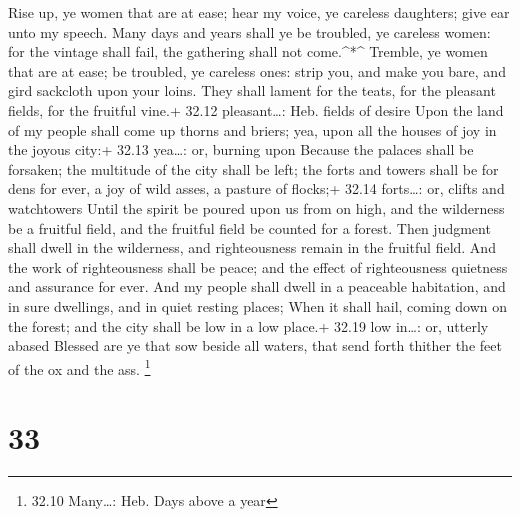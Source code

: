  Rise up, ye women that are at ease; hear my voice, ye
careless daughters; give ear unto my speech.  Many days and
years shall ye be troubled, ye careless women: for the vintage shall
fail, the gathering shall not come.\^{}*\^{}  Tremble, ye
women that are at ease; be troubled, ye careless ones: strip you, and
make you bare, and gird sackcloth upon your loins.  They
shall lament for the teats, for the pleasant fields, for the fruitful
vine.+ 32.12 pleasant\ldots: Heb. fields of desire  Upon
the land of my people shall come up thorns and briers; yea, upon all the
houses of joy in the joyous city:+ 32.13 yea\ldots: or, burning upon
 Because the palaces shall be forsaken; the multitude of
the city shall be left; the forts and towers shall be for dens for ever,
a joy of wild asses, a pasture of flocks;+ 32.14 forts\ldots: or, clifts
and watchtowers  Until the spirit be poured upon us from on
high, and the wilderness be a fruitful field, and the fruitful field be
counted for a forest.  Then judgment shall dwell in the
wilderness, and righteousness remain in the fruitful field.
 And the work of righteousness shall be peace; and the
effect of righteousness quietness and assurance for ever. 
And my people shall dwell in a peaceable habitation, and in sure
dwellings, and in quiet resting places;  When it shall
hail, coming down on the forest; and the city shall be low in a low
place.+ 32.19 low in\ldots: or, utterly abased  Blessed are
ye that sow beside all waters, that send forth thither the feet of the
ox and the ass. \footnote{32.10 Many\ldots: Heb. Days above a year}

\hypertarget{section-32}{%
\section{33}\label{section-32}}


